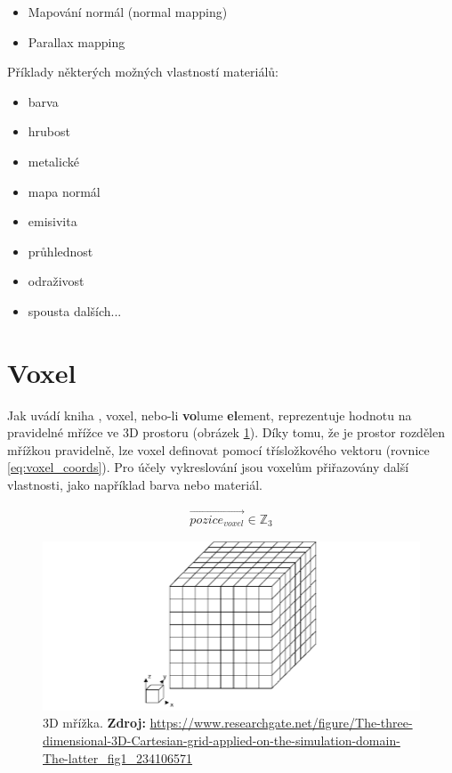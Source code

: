 \begin{itemize}
	\item Mapování normál (normal mapping)
	\item Parallax mapping
\end{itemize}

Příklady některých možných vlastností materiálů:

\begin{itemize}
	\item barva
	\item hrubost
	\item metalické
	\item mapa normál
	\item emisivita
	\item průhlednost
	\item odraživost
	\item spousta dalších...
\end{itemize}




\section{Voxel}
Jak uvádí kniha \cite{gfx_principles_practice}, voxel, nebo-li \textbf{vo}lume \textbf{el}ement, reprezentuje hodnotu na pravidelné mřížce ve 3D prostoru (obrázek \ref{fig:3d_grid}). Díky tomu, že je prostor rozdělen mřížkou pravidelně, lze voxel definovat pomocí třísložkového vektoru (rovnice \ref{eq:voxel_coords}). Pro účely vykreslování jsou voxelům přiřazovány další vlastnosti, jako například barva nebo materiál.

\begin{equation} \label{eq:voxel_coords}
	\begin{gathered}
		\vec{pozice_{voxel}} \in \mathbb{Z}_3
	\end{gathered}
\end{equation}

\begin{figure}[H]
	\centering
	\includegraphics[scale=0.5]{obrazky-figures/3d_grid.png}
	\caption{3D mřížka. \textbf{Zdroj: }\url{https://www.researchgate.net/figure/The-three-dimensional-3D-Cartesian-grid-applied-on-the-simulation-domain-The-latter_fig1_234106571}}
	\label{fig:3d_grid}
\end{figure}

